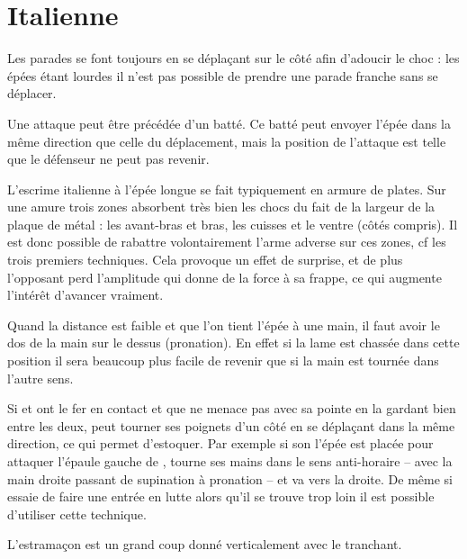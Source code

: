\section{Italienne}



Les parades se font toujours en se déplaçant sur le côté afin d'adoucir le choc : les épées étant lourdes il n'est pas possible de prendre une parade franche sans se déplacer.

Une attaque peut être précédée d'un batté.
Ce batté peut envoyer l'épée dans la même direction que celle du déplacement, mais la position de l'attaque est telle que le défenseur ne peut pas revenir.

L'escrime italienne à l'épée longue se fait typiquement en armure de plates.
Sur une amure trois zones absorbent très bien les chocs du fait de la largeur de la plaque de métal : les avant-bras et bras, les cuisses et le ventre (côtés compris).
Il est donc possible de rabattre volontairement l'arme adverse sur ces zones, cf les trois premiers techniques.
Cela provoque un effet de surprise, et de plus l'opposant perd l'amplitude qui donne de la force à sa frappe, ce qui augmente l'intérêt d'avancer vraiment.

Quand la distance est faible et que l'on tient l'épée à une main, il faut avoir le dos de la main sur le dessus (pronation).
En effet si la lame est chassée dans cette position il sera beaucoup plus facile de revenir que si la main est tournée dans l'autre sens.

Si \A et \D ont le fer en contact et que \A ne menace pas \D avec sa pointe en la gardant bien entre les deux, \D peut tourner ses poignets d'un côté en se déplaçant dans la même direction, ce qui permet d'estoquer.
Par exemple si son l'épée est placée pour attaquer l'épaule gauche de \A, \D tourne ses mains dans le sens anti-horaire – avec la main droite passant de supination à pronation – et va vers la droite.
De même si \A essaie de faire une entrée en lutte alors qu'il se trouve trop loin il est possible d'utiliser cette technique.


\begin{coup}[Estramaçon]

L'estramaçon est un grand coup donné verticalement avec le tranchant.
\end{coup}


